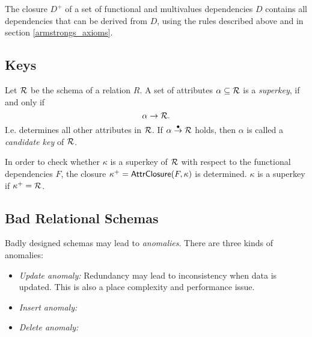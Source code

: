 \begin{note}
The closure $D^+$ of a set of functional and multivalues dependencies $D$ contains all dependencies that can be derived from $D$, using the rules described above and in section \ref{armstrongs_axioms}.
\end{note}




\subsection{Keys}

Let $\mathcal{R}$ be the schema of a relation $R$. A set of attributes $\alpha \subseteq \mathcal{R}$ is a \emph{superkey}, if and only if
\[
\alpha \rightarrow \mathcal{R}.
\]
I.e. determines all other attributes in $\mathcal{R}$. If $\alpha \overset{\bullet}{\rightarrow} \mathcal{R}$ holds, then $\alpha$ is called a \emph{candidate key} of $\mathcal{R}$.

\begin{note} In order to check whether $\kappa$ is a superkey of $\mathcal{R}$ with respect to the functional dependencies $F$, the closure \mbox{$\kappa^+ = \mathsf{AttrClosure}(F,\kappa)$} is determined. $\kappa$ is a superkey if $\kappa^+ = \mathcal{R}$.
\end{note}




\subsection{Bad Relational Schemas}

Badly designed schemas may lead to \emph{anomalies}. There are three kinds of anomalies:
\begin{itemize}
\item \emph{Update anomaly:} Redundancy may lead to inconsistency when data is updated. This is also a place complexity and performance issue.
\item \emph{Insert anomaly:} \todo
\item \emph{Delete anomaly:} \todo
\end{itemize}



